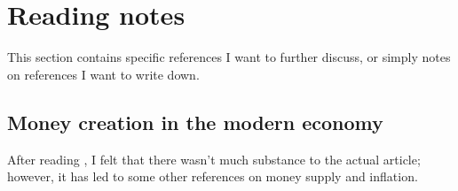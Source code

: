 \section{Reading notes}

This section contains specific references I want to further discuss, or simply notes on references I want to write down.

\subsection{Money creation in the modern economy}

After reading \cite{BOE2014}, I felt that there wasn't much substance to the actual article; however, it has led to some other references on money supply and inflation.